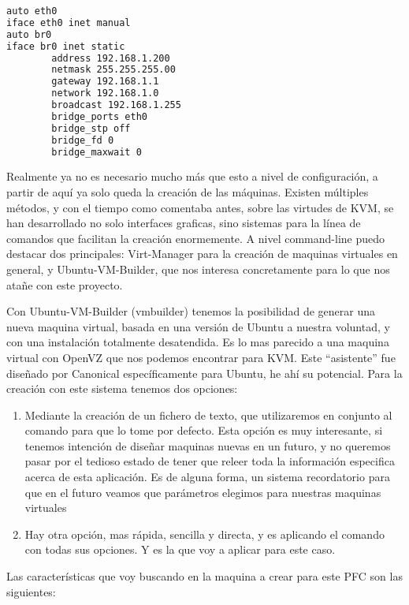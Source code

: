 \begin{lstlisting}[language=bash]
auto eth0
iface eth0 inet manual
auto br0
iface br0 inet static
        address 192.168.1.200
        netmask 255.255.255.00
        gateway 192.168.1.1
        network 192.168.1.0
        broadcast 192.168.1.255
        bridge_ports eth0
        bridge_stp off
        bridge_fd 0
        bridge_maxwait 0
\end{lstlisting}

Realmente ya no es necesario mucho más que esto a nivel de configuración, a partir de aquí ya solo queda la creación de las máquinas. Existen múltiples métodos, y con el tiempo como comentaba antes, sobre las virtudes de KVM, se han desarrollado no solo interfaces graficas, sino sistemas para la línea de comandos que facilitan la creación enormemente. A nivel command-line puedo destacar dos principales: Virt-Manager para la creación de maquinas virtuales en general, y Ubuntu-VM-Builder, que nos interesa concretamente para lo que nos atañe con este proyecto.

Con Ubuntu-VM-Builder (vmbuilder) tenemos la posibilidad de generar una nueva maquina virtual, basada en una versión de Ubuntu a nuestra voluntad, y con una instalación totalmente desatendida. Es lo mas parecido a una maquina virtual con OpenVZ que nos podemos encontrar para KVM. Este “asistente” fue diseñado por Canonical específicamente para Ubuntu, he ahí su potencial. Para la creación con este sistema tenemos dos opciones:

\begin{enumerate}
\item Mediante la creación de un fichero de texto, que utilizaremos en conjunto al comando para que lo tome por defecto. Esta opción es muy interesante, si tenemos intención de diseñar maquinas nuevas en un futuro, y no queremos pasar por el tedioso estado de tener que releer toda la información especifica acerca de esta aplicación. Es de alguna forma, un sistema recordatorio para que en el futuro veamos que parámetros elegimos para nuestras maquinas virtuales
\item Hay otra opción, mas rápida, sencilla y directa, y es aplicando el comando con todas sus opciones. Y es la que voy a aplicar para este caso.
\end{enumerate}

Las características que voy buscando en la maquina a crear para este PFC son las siguientes:

